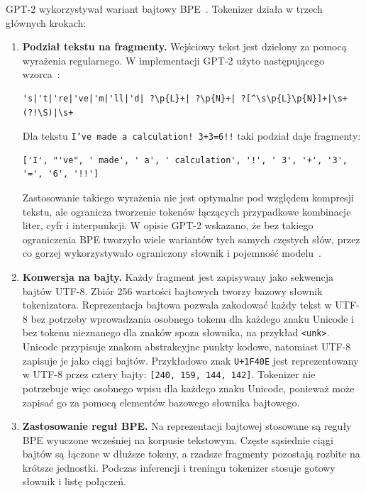 GPT-2 wykorzystywał wariant bajtowy BPE~\autocite{radford-gpt2-2019}. Tokenizer
działa w trzech głównych krokach:

\begin{enumerate}
    \item \textbf{Podział tekstu na fragmenty.} Wejściowy tekst jest dzielony za
    pomocą wyrażenia regularnego. W implementacji GPT-2 użyto następującego
    wzorca~\autocite{openai-gpt2-encoder}:

    \begin{lstlisting}[basicstyle=\small\ttfamily,breaklines=true,numbers=none]
's|'t|'re|'ve|'m|'ll|'d| ?\p{L}+| ?\p{N}+| ?[^\s\p{L}\p{N}]+|\s+(?!\S)|\s+
    \end{lstlisting}

    Dla tekstu \texttt{I've made a calculation! 3+3=6!!} taki podział daje
    fragmenty:

    \begin{lstlisting}[basicstyle=\small\ttfamily,breaklines=true,numbers=none]
['I', "'ve", ' made', ' a', ' calculation', '!', ' 3', '+', '3', '=', '6', '!!']
    \end{lstlisting}

    Zastosowanie takiego wyrażenia nie jest optymalne pod względem kompresji
    tekstu, ale ogranicza tworzenie tokenów łączących przypadkowe kombinacje
    liter, cyfr i interpunkcji. W opisie GPT-2 wskazano, że bez takiego
    ograniczenia BPE tworzyło wiele wariantów tych samych częstych słów, przez
    co gorzej wykorzystywało ograniczony słownik i pojemność
    modelu~\autocite{radford-gpt2-2019}.

    \item \textbf{Konwersja na bajty.} Każdy fragment jest zapisywany jako
    sekwencja bajtów UTF-8. Zbiór 256 wartości bajtowych tworzy bazowy słownik
    tokenizatora. Reprezentacja bajtowa pozwala zakodować każdy tekst w UTF-8
    bez potrzeby wprowadzania osobnego tokenu dla każdego znaku Unicode i bez
    tokenu nieznanego dla znaków spoza słownika, na przykład \texttt{<unk>}.
    Unicode przypisuje znakom abstrakcyjne punkty kodowe, natomiast UTF-8
    zapisuje je jako ciągi bajtów. Przykładowo
    znak \texttt{U+1F40E} jest reprezentowany w UTF-8 przez cztery bajty:
    \texttt{[240, 159, 144, 142]}. Tokenizer nie potrzebuje więc osobnego wpisu
    dla każdego znaku Unicode, ponieważ może zapisać go za pomocą elementów
    bazowego słownika bajtowego.

    \item \textbf{Zastosowanie reguł BPE.} Na reprezentacji bajtowej stosowane są
    reguły BPE wyuczone wcześniej na korpusie tekstowym. Częste sąsiednie ciągi
    bajtów są łączone w dłuższe tokeny, a rzadsze fragmenty pozostają rozbite na
    krótsze jednostki. Podczas inferencji i treningu tokenizer stosuje gotowy słownik i
    listę połączeń.
\end{enumerate}

